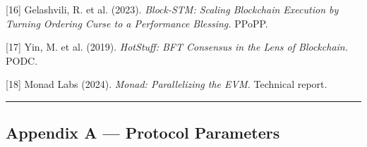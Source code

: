 \documentclass[11pt,a4paper]{article}
\begin{document}
{[}16{]} Gelashvili, R. et al. (2023). \emph{Block-STM: Scaling
Blockchain Execution by Turning Ordering Curse to a Performance
Blessing.} PPoPP.

{[}17{]} Yin, M. et al. (2019). \emph{HotStuff: BFT Consensus in the
Lens of Blockchain.} PODC.

{[}18{]} Monad Labs (2024). \emph{Monad: Parallelizing the EVM.}
Technical report.

\begin{center}\rule{0.5\linewidth}{0.5pt}\end{center}

\hypertarget{appendix-a--protocol-parameters}{%
\subsection{Appendix A --- Protocol
Parameters}\label{appendix-a--protocol-parameters}}
\end{document}

